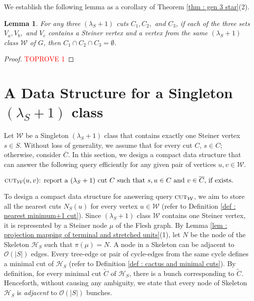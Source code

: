 \documentclass[letterpaper,11pt]{article}
\newtheorem{lemma}{Lemma}[]
\begin{document}
We establish the following lemma as a corollary of Theorem \ref{thm : gen 3 star}(2).

\begin{lemma} \label{lem : cor of gen 3 star}
    For any three $(\lambda_S+1)$ cuts $C_1,C_2,$ and $C_3$, if each of the three sets $V_a, V_b,$ and $V_c$ contains a Steiner vertex and a vertex from the same $(\lambda_S+1)$ class ${\mathcal W}$ of $G$, then $C_1\cap C_2 \cap C_3=\emptyset$.
\end{lemma}
\begin{proof}\textcolor{red}{TOPROVE 1}\end{proof}

\section{A Data Structure for a Singleton $(\lambda_S+1)$ class} \label{sec : data structure for singleton class}
Let ${\mathcal W}$ be a Singleton $(\lambda_S+1)$ class that contains exactly one Steiner vertex $s\in S$. Without loss of generality, we assume that for every cut $C$, $s\in C$; otherwise, consider $\overline{C}$. In this section, we design a compact data structure that can answer the following query efficiently for any given pair of vertices $u,v\in {\mathcal W}$.
\begin{center}
    $\textsc{cut}_{\mathcal W}(u,v)\text{: report a $(\lambda_S+1)$ cut $C$ such that $s,u\in C$ and $v\in \overline{C}$, if exists.}$
\end{center}


\noindent
To design a compact data structure for answering query $\textsc{cut}_{\mathcal W}$, we aim to store all the nearest cuts $N_S(u)$ for every vertex $u\in {\mathcal W}$ (refer to Definition \ref{def : nearest minimum+1 cut}). Since $(\lambda_S+1)$ class ${\mathcal W}$ contains one Steiner vertex, it is represented by a Steiner node $\mu$ of the Flesh graph. By Lemma \ref{lem : projection mapping of terminal and stretched units}(1), let $N$ be the node of the Skeleton ${\mathcal H}_S$ such that $\pi(\mu)=N$. A node in a Skeleton can be adjacent to ${\mathcal O}(|S|)$ edges. Every tree-edge or pair of cycle-edges from the same cycle defines a minimal cut of ${\mathcal H}_S$ (refer to Definition \ref{def : cactus and minimal cuts}). By definition, for every minimal cut $\tilde C$ of ${\mathcal H}_S$, there is a bunch corresponding to $\tilde C$. Henceforth, without causing any ambiguity, we state that every node of Skeleton ${\mathcal H}_S$ is \textit{adjacent} to ${\mathcal O}(|S|)$ bunches. 
\end{document}

